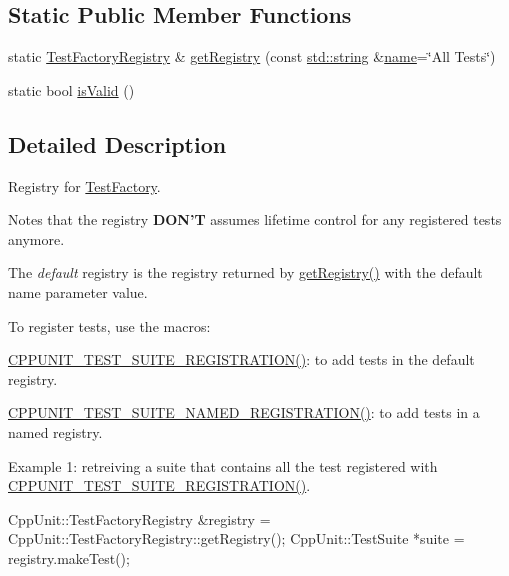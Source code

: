 \subsection*{Static Public Member Functions}
\begin{DoxyCompactItemize}
\item 
static \hyperlink{class_test_factory_registry}{Test\-Factory\-Registry} \& \hyperlink{class_test_factory_registry_a1331b28bb1a8bc3db6b8e5ec994ef4ab}{get\-Registry} (const \hyperlink{glew_8h_ae84541b4f3d8e1ea24ec0f466a8c568b}{std\-::string} \&\hyperlink{fmod__codec_8h_a5c4947d4516dd7cfa3505ce3a648a4ef}{name}=\char`\"{}All Tests\char`\"{})
\item 
static bool \hyperlink{class_test_factory_registry_a8638d92944309341c68089aa098800cb}{is\-Valid} ()
\end{DoxyCompactItemize}


\subsection{Detailed Description}
Registry for \hyperlink{class_test_factory}{Test\-Factory}.

Notes that the registry {\bfseries D\-O\-N'T} assumes lifetime control for any registered tests anymore. 

The {\itshape default} registry is the registry returned by \hyperlink{class_test_factory_registry_a1331b28bb1a8bc3db6b8e5ec994ef4ab}{get\-Registry()} with the default name parameter value.

To register tests, use the macros\-:
\begin{DoxyItemize}
\item \hyperlink{_helper_macros_8h_a2f4071eec88d1e306665ada0f2dd80e4}{C\-P\-P\-U\-N\-I\-T\-\_\-\-T\-E\-S\-T\-\_\-\-S\-U\-I\-T\-E\-\_\-\-R\-E\-G\-I\-S\-T\-R\-A\-T\-I\-O\-N()}\-: to add tests in the default registry.
\item \hyperlink{_helper_macros_8h_a028a5855a40ad3836e2a26aa48cd4c91}{C\-P\-P\-U\-N\-I\-T\-\_\-\-T\-E\-S\-T\-\_\-\-S\-U\-I\-T\-E\-\_\-\-N\-A\-M\-E\-D\-\_\-\-R\-E\-G\-I\-S\-T\-R\-A\-T\-I\-O\-N()}\-: to add tests in a named registry.
\end{DoxyItemize}

Example 1\-: retreiving a suite that contains all the test registered with \hyperlink{_helper_macros_8h_a2f4071eec88d1e306665ada0f2dd80e4}{C\-P\-P\-U\-N\-I\-T\-\_\-\-T\-E\-S\-T\-\_\-\-S\-U\-I\-T\-E\-\_\-\-R\-E\-G\-I\-S\-T\-R\-A\-T\-I\-O\-N()}. 
\begin{DoxyCode}
CppUnit::TestFactoryRegistry &registry = CppUnit::TestFactoryRegistry::getRegistry();
CppUnit::TestSuite *suite = registry.makeTest();
\end{DoxyCode}


